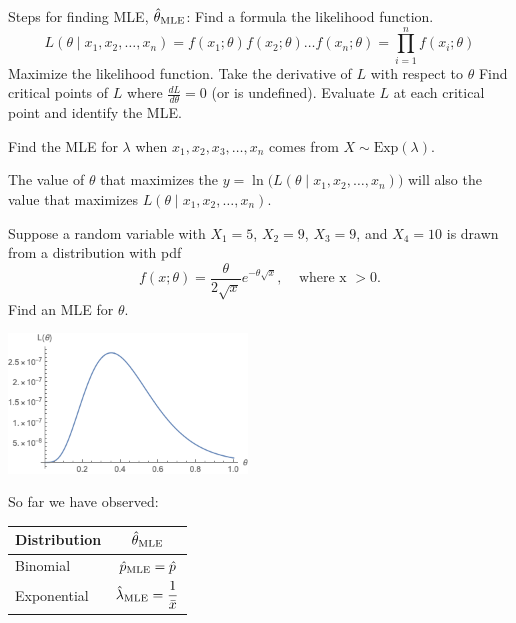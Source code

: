 \bs

 \bbox
Steps for finding MLE, $\hat{\theta}_{\rm MLE}$:
\bb
\ii Find a formula the likelihood function.
\[ L(\theta \mid x_1, x_2, \ldots , x_n) = f(x_1; \theta) f(x_2; \theta) \ldots f(x_n; \theta) = \prod_{i=1}^n f(x_i; \theta) \]
\ii Maximize the likelihood function.
\bb
\ii Take the derivative of $L$ with respect to $\theta$
\ii Find critical points of $L$ where $\frac{dL}{d\theta}=0$ (or is undefined).
\ii Evaluate $L$ at each critical point and identify the MLE.
\ee
\ee
\ebox

\clearpage

\bb[resume]
\ii Find the MLE for $\lambda$ when $x_1, x_2, x_3, \ldots, x_n$ comes from $X \sim \mbox{Exp}(\lambda)$.

 \vfill

\ee

\bbox
The value of $\theta$ that maximizes the  $y = \ln{\bigg( L(\theta \mid x_1, x_2, \ldots , x_n) \bigg)}$ will also the value that maximizes $L(\theta \mid x_1, x_2, \ldots , x_n)$.
\ebox

\clearpage


\bb[resume]
\ii Suppose a random variable with $X_1=5$, $X_2=9$, $X_3=9$, and $X_4=10$ is drawn from a distribution with pdf
\[ f( x; \theta) = \frac{\theta}{2\sqrt{x}}e^{-\theta \sqrt{x}}, \ \ \ \ \ \mbox{where x $>0$}.\]
Find an MLE  for $\theta$.
\ee


\vfill

\hspace{3in} \includegraphics[width=2.5in]{14/fig-theta-mle.png}

\clearpage


 So far we have observed:
  \begin{center}
    \begin{tabular}{l|c}
      Distribution & $\displaystyle \hat{\theta}_{\rm MLE}$ \\
      \hline
      Binomial & $\displaystyle \hat{p}_{\rm MLE} = \hat{p}$ \\
      \hline
      Exponential & $\displaystyle \hat{\lambda}_{\rm MLE} = \frac{1}{\bar{x}}$
    \end{tabular}
  \end{center} 

